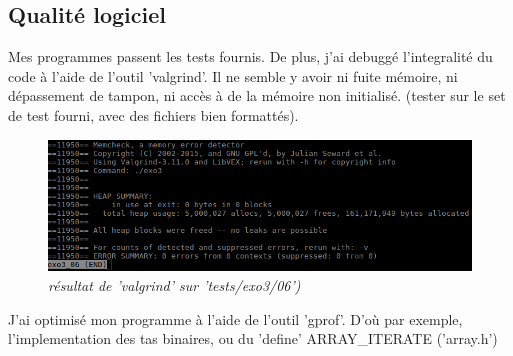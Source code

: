 \documentclass[10pt]{article}
\begin{document}
		\subsection{Qualité logiciel}
			Mes programmes passent les tests fournis.\newline    
			De plus, j'ai debuggé l'integralité du code à l'aide de l'outil 'valgrind'.
			Il ne semble y avoir ni fuite mémoire, ni dépassement de tampon, ni accès à de la mémoire non initialisé.
			(tester sur le set de test fourni, avec des fichiers bien formattés).
			\begin{figure}[H]
				\begin{center}
					\includegraphics[width=12cm,height=\textheight,keepaspectratio]{./images/valgrind.png}
				\end{center}
				\caption{\textit{résultat de 'valgrind' sur 'tests/exo3/06')}}
			\end{figure}
			J'ai optimisé mon programme à l'aide de l'outil 'gprof'.
			D'où par exemple, l'implementation des tas binaires, ou du 'define' ARRAY\_ITERATE ('array.h')

	\newpage
\end{document}
